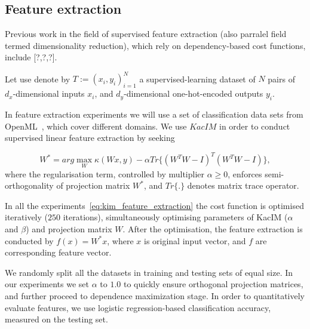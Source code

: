 \documentclass{article}
\begin{document}


\subsection{Feature extraction}

Previous work in the field of supervised feature extraction (also parralel field termed dimensionality reduction), which rely on dependency-based cost functions, include [?,?,?]. 




Let use denote by $T := (x_{i},y_{i})_{i=1}^{N}$ a supervised-learning dataset of $N$ pairs of $d_{x}$-dimensional inputs $x_{i}$, and $d_{y}$-dimensional one-hot-encoded outputs $y_{i}$.

In feature extraction experiments we will use a set of classification data sets from OpenML~\cite{OpenML2013}, which cover different domains.  We use $KacIM$ in order to conduct supervised linear feature extraction by seeking 

\begin{equation}
\label{eq:kim_feature_extraction}    
W^{*} = arg \max_{W} \kappa(Wx, y) - \alpha Tr\{(W^{T}W-I)^{T}(W^{T}W-I) \},
\end{equation}
where the regularisation term, controlled by multiplier $\alpha \geq 0$, enforces semi-orthogonality of projection matrix $W^{*}$, and $Tr\{.\}$ denotes matrix trace operator.


In all the experiments~\eqref{eq:kim_feature_extraction} the cost function is optimised iteratively ($250$ iterations), simultaneously optimising parameters of KacIM ($\alpha$ and $\beta$) and projection matrix $W$.
After the optimisation, the feature extraction is conducted by $f(x) = W^{*}x$, where $x$ is original input vector, and $f$ are corresponding feature vector. 



We randomly split all the datasets in training and testing sets of equal size. %
In our experiments we set $\alpha$ to $1.0$ to quickly ensure orthogonal projection matrices, and further proceed to dependence maximization stage. In order to quantitatively evaluate features, we use logistic regression-based classification accuracy, measured on the testing set.
\end{document}
